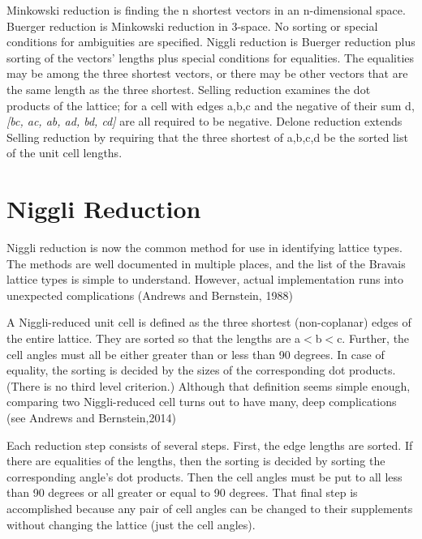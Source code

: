 \documentclass[11pt]{article} %
\begin{document}
Minkowski reduction\cite{Minkowski1905} is finding the n shortest vectors in an n-dimensional space. Buerger reduction\cite{Buerger1960} is Minkowski reduction in 3-space. No sorting or special conditions for ambiguities are specified. Niggli reduction\cite{Niggli1928} is Buerger reduction plus sorting of the vectors' lengths plus special conditions for equalities. The equalities may be among the three shortest vectors, or there may be other vectors that are the same length as the three shortest. Selling reduction\cite{Selling1874} examines the dot products of the lattice; for a cell with edges a,b,c and the negative of their sum d, \textit{[b{\textbullet}c, a{\textbullet}c, a{\textbullet}b, a{\textbullet}d, b{\textbullet}d, c{\textbullet}d]} are all required to be negative. Delone reduction extends Selling reduction by requiring that the three shortest of a,b,c,d be the sorted list of the unit cell lengths.

\section{Niggli Reduction}

Niggli reduction is now the common method for use in identifying lattice types. The methods are well documented in multiple places, and the list of the Bravais lattice types is simple to understand. However, actual implementation runs into unexpected complications (Andrews and Bernstein, 1988\cite{Andrews1988})

A Niggli-reduced unit cell is defined as the three shortest (non-coplanar) edges of the entire lattice. They are sorted so that the lengths are a$<$b$<$c. Further, the cell angles must all be either greater than or less than 90 degrees. In case of equality, the sorting is decided by the sizes of the corresponding dot products. (There is no third level criterion.) Although that definition seems simple enough, comparing two Niggli-reduced cell turns out to have many, deep complications (see Andrews and Bernstein,2014\cite{Andrews2014})

Each reduction step consists of several steps. First, the edge lengths are sorted. If there are equalities of the lengths, then the sorting is decided by sorting the corresponding angle's dot products. Then the cell angles must be put to all less than 90 degrees or all greater or equal to 90 degrees. That final step is accomplished because any pair of cell angles can be changed to their supplements without changing the lattice (just the cell angles). 
\end{document}
